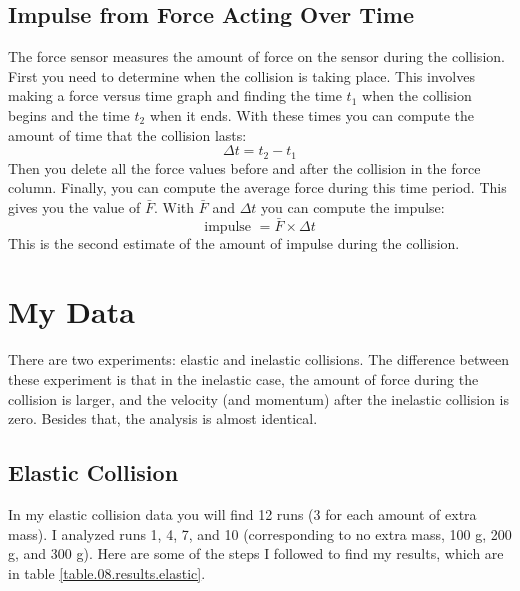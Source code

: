 \subsection{Impulse from Force Acting Over Time}
The force sensor measures the amount of force on the sensor during the collision. First you need to determine when the collision is taking place. This involves making a force versus time graph and finding the time $t_{1}$ when the collision begins and the time $t_{2}$ when it ends. With these times you can compute the amount of time that the collision lasts:
\begin{equation}
    \Delta t = t_{2} - t_{1}
\end{equation}
Then you delete all the force values before and after the collision in the force column. Finally, you can compute the average force during this time period. This gives you the value of $\bar{F}$. With $\bar{F}$ and $\Delta t$ you can compute the impulse:
\begin{equation}
    \text{impulse } = \bar{F} \times \Delta t
\end{equation}
This is the second estimate of the amount of impulse during the collision.
\section{My Data}
There are two experiments: elastic and inelastic collisions. The difference between these experiment is that in the inelastic case, the amount of force during the collision is larger, and the velocity (and momentum) after the inelastic collision is zero. Besides that, the analysis is almost identical.
\subsection{Elastic Collision}
In my elastic collision data you will find 12 runs (3 for each amount of extra mass). I analyzed runs 1, 4, 7, and 10 (corresponding to no extra mass, 100 g, 200 g, and 300 g). Here are some of the steps I followed to find my results, which are in table \ref{table.08.results.elastic}.

